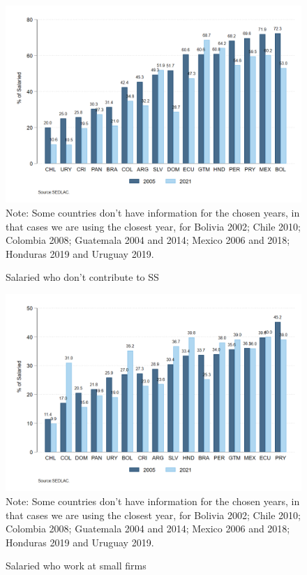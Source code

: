 \documentclass[english]{article}
\begin{document}
\begin{figure}[!htb]
    \centering
     \caption{Salaried who don’t contribute to SS}     
     \includegraphics[scale=.3]{latex/figures/Snapshot/snapshot_informal_ss_dep.png}
    \label{fig:SalariedSS}
    \footnotesize{Note: Some countries don’t have information for the chosen years, in that cases we are using the closest year, for Bolivia 2002; Chile 2010; Colombia 2008; Guatemala 2004 and 2014; Mexico 2006 and 2018; Honduras 2019 and Uruguay 2019.}
\end{figure}

\begin{figure}[!htb]
    \centering
     \caption{Salaried who work at small firms}     
     \includegraphics[scale=.3]{latex/figures/Snapshot/snapshot_dependents_small.png}
    \label{fig:SalariedSmall}
    \footnotesize{Note: Some countries don’t have information for the chosen years, in that cases we are using the closest year, for Bolivia 2002; Chile 2010; Colombia 2008; Guatemala 2004 and 2014; Mexico 2006 and 2018; Honduras 2019 and Uruguay 2019.}
\end{figure}
\end{document}
